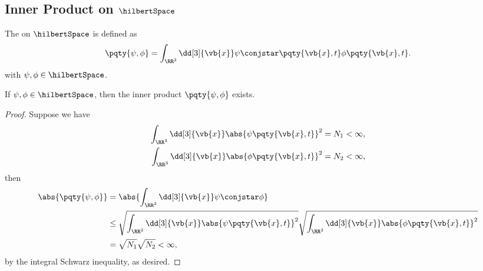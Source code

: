 \subsection{Inner Product on \(\hilbertSpace\)}

\begin{definition}
    The  on \(\hilbertSpace\) is defined as
    \begin{equation}
        \pqty{\psi, \phi} = \int_{\RR^3} \dd[3]{\vb{x}} \psi\conjstar \pqty{\vb{x}, t} \phi\pqty{\vb{x}, t}.
    \end{equation}
    with \(\psi, \phi \in \hilbertSpace\).
\end{definition}

\begin{theorem}
    If \(\psi, \phi \in \hilbertSpace\), then the inner product \(\pqty{\psi, \phi}\) exists.
\end{theorem}

\begin{proof}
    Suppose we have
    \begin{subequations}
        \begin{align}
            \int_{\RR^3} \dd[3]{\vb{x}} \abs{\psi\pqty{\vb{x}, t}}^2 &= N_1 < \infty, \\
            \int_{\RR^3} \dd[3]{\vb{x}} \abs{\phi\pqty{\vb{x}, t}}^2 &= N_2 < \infty,
        \end{align}
    \end{subequations}
    then
    \begin{subequations}
        \begin{align}
            \abs{\pqty{\psi, \phi}} &= \abs{\int_{\RR^3} \dd[3]{\vb{x}} \psi\conjstar \phi} \\
            &\leq \sqrt{\int_{\RR^3} \dd[3]{\vb{x}} \abs{\psi\pqty{\vb{x}, t}}^2} \sqrt{\int_{\RR^3} \dd[3]{\vb{x}} \abs{\phi\pqty{\vb{x}, t}}^2} \\
            &= \sqrt{N_1} \sqrt{N_2} < \infty,
        \end{align}
    \end{subequations}
    by the integral Schwarz inequality, as desired.
\end{proof}

